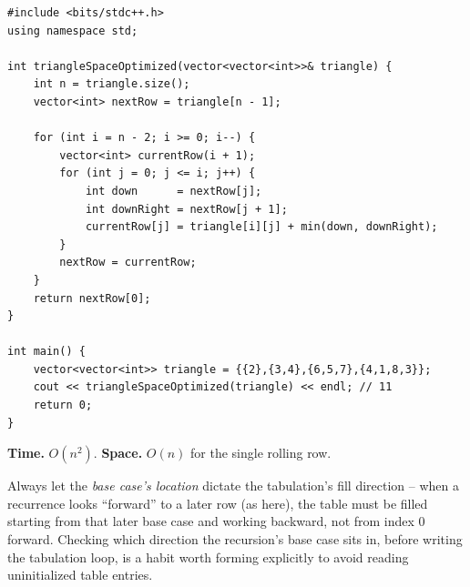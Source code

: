 \begin{lstlisting}
#include <bits/stdc++.h>
using namespace std;

int triangleSpaceOptimized(vector<vector<int>>& triangle) {
    int n = triangle.size();
    vector<int> nextRow = triangle[n - 1];

    for (int i = n - 2; i >= 0; i--) {
        vector<int> currentRow(i + 1);
        for (int j = 0; j <= i; j++) {
            int down      = nextRow[j];
            int downRight = nextRow[j + 1];
            currentRow[j] = triangle[i][j] + min(down, downRight);
        }
        nextRow = currentRow;
    }
    return nextRow[0];
}

int main() {
    vector<vector<int>> triangle = {{2},{3,4},{6,5,7},{4,1,8,3}};
    cout << triangleSpaceOptimized(triangle) << endl; // 11
    return 0;
}
\end{lstlisting}

\begin{complexitybox}
\textbf{Time.} $O(n^2)$.
\textbf{Space.} $O(n)$ for the single rolling row.
\end{complexitybox}

\begin{takeawaybox}
Always let the \emph{base case's location} dictate the tabulation's fill
direction -- when a recurrence looks ``forward'' to a later row (as
here), the table must be filled starting from that later base case and
working backward, not from index $0$ forward. Checking which direction
the recursion's base case sits in, before writing the tabulation loop, is
a habit worth forming explicitly to avoid reading uninitialized table
entries.
\end{takeawaybox}
